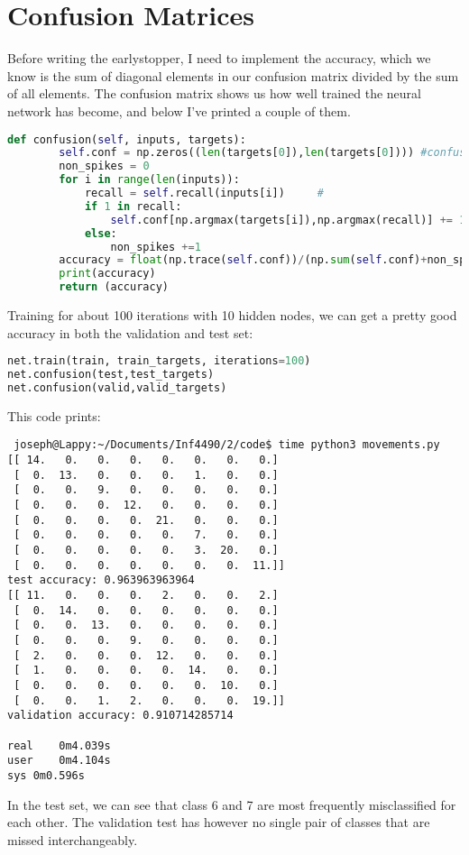 \documentclass[10pt, a4paper]{article}
\begin{document}
\section{Confusion Matrices}
Before writing the earlystopper, I need to implement the accuracy, which we know is the sum of diagonal elements in our confusion matrix divided by the sum of all elements.
The confusion matrix shows us how well trained the neural network has become, and below I've printed a couple of them.
\begin{lstlisting}[language = Python]
     def confusion(self, inputs, targets):
        self.conf = np.zeros((len(targets[0]),len(targets[0]))) #confusion matrix dim: 8x8
        non_spikes = 0
        for i in range(len(inputs)):
            recall = self.recall(inputs[i])     #
            if 1 in recall:
                self.conf[np.argmax(targets[i]),np.argmax(recall)] += 1
            else:
                non_spikes +=1
        accuracy = float(np.trace(self.conf))/(np.sum(self.conf)+non_spikes)
        print(accuracy)
        return (accuracy)
\end{lstlisting}
Training for about 100 iterations with 10 hidden nodes, we can get a pretty good accuracy in both the validation and test set:
\begin{lstlisting}[language = Python]
net.train(train, train_targets, iterations=100)
net.confusion(test,test_targets)
net.confusion(valid,valid_targets)
\end{lstlisting}
This code prints:
\begin{lstlisting}
 joseph@Lappy:~/Documents/Inf4490/2/code$ time python3 movements.py 
[[ 14.   0.   0.   0.   0.   0.   0.   0.]
 [  0.  13.   0.   0.   0.   1.   0.   0.]
 [  0.   0.   9.   0.   0.   0.   0.   0.]
 [  0.   0.   0.  12.   0.   0.   0.   0.]
 [  0.   0.   0.   0.  21.   0.   0.   0.]
 [  0.   0.   0.   0.   0.   7.   0.   0.]
 [  0.   0.   0.   0.   0.   3.  20.   0.]
 [  0.   0.   0.   0.   0.   0.   0.  11.]]
test accuracy: 0.963963963964
[[ 11.   0.   0.   0.   2.   0.   0.   2.]
 [  0.  14.   0.   0.   0.   0.   0.   0.]
 [  0.   0.  13.   0.   0.   0.   0.   0.]
 [  0.   0.   0.   9.   0.   0.   0.   0.]
 [  2.   0.   0.   0.  12.   0.   0.   0.]
 [  1.   0.   0.   0.   0.  14.   0.   0.]
 [  0.   0.   0.   0.   0.   0.  10.   0.]
 [  0.   0.   1.   2.   0.   0.   0.  19.]]
validation accuracy: 0.910714285714

real	0m4.039s
user	0m4.104s
sys	0m0.596s
\end{lstlisting}
In the test set, we can see that class 6 and 7 are most frequently misclassified for each other.
The validation test has however no single pair of classes that are missed interchangeably.
\end{document}

